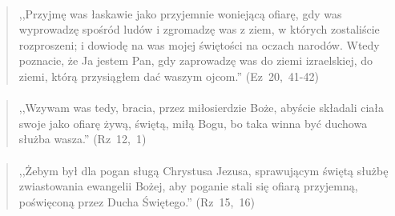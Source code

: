 \documentclass[10pt,a4paper,oneside]{article}
\begin{document}
\paragraph{}
\begin{quote}
,,Przyjmę was łaskawie jako przyjemnie woniejącą ofiarę, gdy was wyprowadzę spośród ludów i zgromadzę was z ziem, w których zostaliście rozproszeni; i dowiodę na was mojej świętości na oczach narodów. Wtedy poznacie, że Ja jestem Pan, gdy zaprowadzę was do ziemi izraelskiej, do ziemi, którą przysiągłem dać waszym ojcom.'' \mbox{(Ez 20, 41-42)}
\end{quote}
\paragraph{}
\begin{quote}
,,Wzywam was tedy, bracia, przez miłosierdzie Boże, abyście składali ciała swoje jako ofiarę żywą, świętą, miłą Bogu, bo taka winna być duchowa służba wasza.'' \mbox{(Rz 12, 1)}
\end{quote}
\paragraph{}
\begin{quote}
,,Żebym był dla pogan sługą Chrystusa Jezusa, sprawującym świętą służbę zwiastowania ewangelii Bożej, aby poganie stali się ofiarą przyjemną, poświęconą przez Ducha Świętego.'' \mbox{(Rz 15, 16)}
\end{quote}
\end{document}
